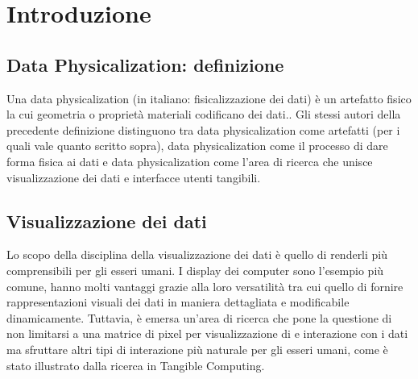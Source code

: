 \documentclass[12pt,a4paper]{report}
\begin{document}

\chapter{Introduzione}
\section{Data Physicalization: definizione}
Una data physicalization (in italiano: fisicalizzazione dei dati) è un artefatto fisico la cui geometria o proprietà materiali codificano dei dati.\cite{dataphysorg:terminology}.
Gli stessi autori della precedente definizione distinguono tra data physicalization come artefatti (per i quali vale quanto scritto sopra),
data physicalization come il processo di dare forma fisica ai dati e data physicalization come l'area di ricerca che unisce visualizzazione
dei dati e interfacce utenti tangibili.

\section{Visualizzazione dei dati}
Lo scopo della disciplina della visualizzazione dei dati è quello di renderli più comprensibili per gli esseri umani. I display dei computer
sono l'esempio più comune, hanno molti vantaggi grazie alla loro versatilità tra cui quello di fornire rappresentazioni visuali dei dati in
maniera dettagliata e modificabile dinamicamente. Tuttavia, è emersa un'area di ricerca che pone la questione di non limitarsi a una
matrice di pixel per visualizzazione di e interazione con i dati ma sfruttare altri tipi di interazione più naturale per gli esseri umani, come
è stato illustrato dalla ricerca in Tangible Computing. \cite{hal:dataphys}
\end{document}

